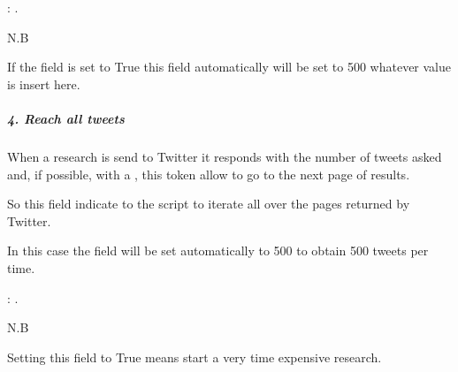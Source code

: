 \documentclass[letterpaper,10pt,english]{sphinxmanual}
\begin{document}
\begin{DUlineblock}{0em}
\item[] : .
\end{DUlineblock}

\begin{DUlineblock}{0em}
\item[] N.B
\item[] If the  field is set to True this field automatically will be set to 500 whatever value is insert here.
\end{DUlineblock}


\subparagraph{4. Reach all tweets}
\label{\detokenize{guide/tweet_search_guide:reach-all-tweets}}
\begin{sphinxVerbatim}[commandchars=\\\{\}]
 
\end{sphinxVerbatim}

\begin{DUlineblock}{0em}
\item[] When a research is send to Twitter it responds with the number of tweets asked and, if possible, with a , this token allow to go to the next page of results.
\item[] So this field indicate to the script to iterate all over the pages returned by Twitter.
\item[] In this case the  field will be set automatically to 500 to obtain 500 tweets per time.
\end{DUlineblock}

\begin{DUlineblock}{0em}
\item[] : .
\end{DUlineblock}

\begin{DUlineblock}{0em}
\item[] N.B
\item[] Setting this field to True means start a very time expensive research.
\end{DUlineblock}
\end{document}
